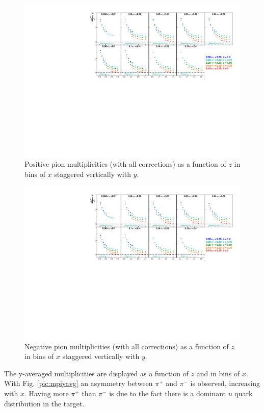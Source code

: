 \begin{figure}[!h]
  \centering
	\includegraphics[scale=0.85]{./gfx/pip.pdf}
	\caption{Positive pion multiplicities (with all corrections) as a function of $z$ in bins of $x$ staggered vertically with $y$.}
	\label{pic:mpip}
\end{figure}

\begin{figure}[!h]
  \centering
	\includegraphics[scale=0.85]{./gfx/pim.pdf}
	\caption{Negative pion multiplicities (with all corrections) as a function of $z$ in bins of $x$ staggered vertically with $y$.}
	\label{pic:mpim}
\end{figure}

The y-averaged multiplicities are displayed as a function of $z$ and in bins of $x$. With Fig. \ref{pic:mpiyavg} an asymmetry between $\pi^+$ and $\pi^-$ is observed, increasing with $x$. Having more $\pi^+$ than $\pi^-$ is due to the fact there is a dominant $u$ quark distribution in the target.

